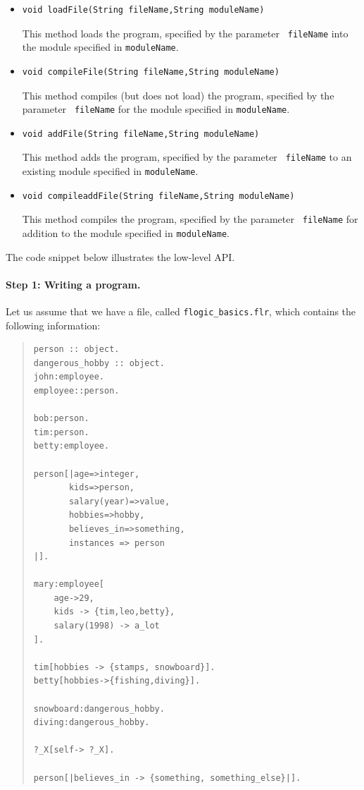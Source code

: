 \begin{itemize}
  See the examples below for how to handle the results
  returned by this method.

\item
\begin{verbatim}
void loadFile(String fileName,String moduleName)
\end{verbatim}
  This method loads the \FLSYSTEM program, specified by the parameter {\tt
    fileName} into the \FLSYSTEM module specified in {\tt moduleName}.
\item
\begin{verbatim}
void compileFile(String fileName,String moduleName)
\end{verbatim}
  This method compiles (but does not load)
  the \FLSYSTEM program, specified by the parameter {\tt
    fileName} for the \FLSYSTEM module specified in {\tt moduleName}.
\item
\begin{verbatim}
void addFile(String fileName,String moduleName)
\end{verbatim}
  This method adds the \FLSYSTEM program, specified by the parameter {\tt
    fileName} to an existing \FLSYSTEM module specified in {\tt moduleName}.
\item
\begin{verbatim}
void compileaddFile(String fileName,String moduleName)
\end{verbatim}
  This method compiles the \FLSYSTEM program, specified by the parameter {\tt
    fileName} for addition to the \FLSYSTEM module specified in {\tt moduleName}.
\end{itemize}

The code snippet below illustrates the low-level API.

\paragraph{Step 1: Writing a \FLSYSTEM program.}
  Let us assume that we have a file, called  {\tt flogic\_basics.flr},
  which contains the following information:
\begin{quote}
\begin{verbatim}
person :: object.
dangerous_hobby :: object.
john:employee.
employee::person.

bob:person.
tim:person.
betty:employee.

person[|age=>integer,
       kids=>person,
       salary(year)=>value,
       hobbies=>hobby,
       believes_in=>something,
       instances => person
|].

mary:employee[
    age->29,
    kids -> {tim,leo,betty},
    salary(1998) -> a_lot
].

tim[hobbies -> {stamps, snowboard}].
betty[hobbies->{fishing,diving}].

snowboard:dangerous_hobby.
diving:dangerous_hobby.

?_X[self-> ?_X].

person[|believes_in -> {something, something_else}|].
\end{verbatim}
\end{quote}

